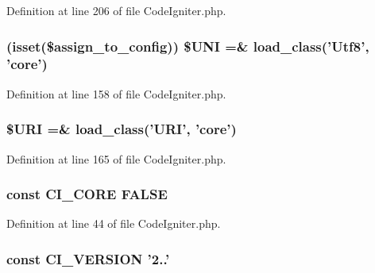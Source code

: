 Definition at line 206 of file Code\-Igniter.\-php.

\subsubsection[{\$\-U\-N\-I}]{ (isset(\$assign\-\_\-to\-\_\-config)) \$U\-N\-I =\& load\-\_\-class('Utf8', 'core')}\label{_code_igniter_8php_a0eedd12db0d3774c174f0dba59577357}


Definition at line 158 of file Code\-Igniter.\-php.

\subsubsection[{\$\-U\-R\-I}]{\setlength{\rightskip}{0pt plus 5cm}\$U\-R\-I =\& load\-\_\-class('U\-R\-I', 'core')}\label{_code_igniter_8php_a630d83d898b39ad4568906284f7f5336}


Definition at line 165 of file Code\-Igniter.\-php.

\subsubsection[{C\-I\-\_\-\-C\-O\-R\-E}]{\setlength{\rightskip}{0pt plus 5cm}const C\-I\-\_\-\-C\-O\-R\-E F\-A\-L\-S\-E}\label{_code_igniter_8php_aefc9cd12024bd0164da3aeafe9635c30}


Definition at line 44 of file Code\-Igniter.\-php.

\subsubsection[{C\-I\-\_\-\-V\-E\-R\-S\-I\-O\-N}]{\setlength{\rightskip}{0pt plus 5cm}const C\-I\-\_\-\-V\-E\-R\-S\-I\-O\-N '2..'}\label{_code_igniter_8php_a32e3c3927ba8ec93df92327dfd85d564}


